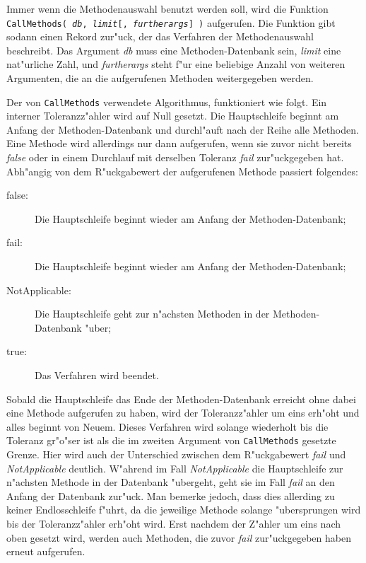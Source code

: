 \documentclass[a4paper,11pt]{article}
\theoremstyle{bla}
\begin{document}
Immer wenn die Methodenauswahl benutzt werden soll, wird die Funktion \texttt{CallMethods( \textit{db}, \textit{limit}[, \textit{furtherargs}] )} aufgerufen. Die Funktion gibt sodann einen Rekord zur"uck, der das Verfahren der Methodenauswahl beschreibt. Das Argument \textit{db} muss eine Methoden-Datenbank sein, \textit{limit} eine nat"urliche Zahl, und \textit{furtherargs} steht f"ur eine beliebige Anzahl von weiteren Argumenten, die an die aufgerufenen Methoden weitergegeben werden.

Der von \texttt{CallMethods} verwendete Algorithmus, funktioniert wie folgt. Ein interner Toleranzz"ahler wird auf Null gesetzt. Die Hauptschleife beginnt am Anfang der Methoden-Datenbank und durchl"auft nach der Reihe alle Methoden. Eine Methode wird allerdings nur dann aufgerufen, wenn sie zuvor nicht bereits \textit{false} oder in einem Durchlauf mit derselben Toleranz \textit{fail} zur"uckgegeben hat. Abh"angig von dem R"uckgabewert der aufgerufenen Methode passiert folgendes:

\begin{description}
 \item[false:] Die Hauptschleife beginnt wieder am Anfang der Methoden-Datenbank;
 \item[fail:] Die Hauptschleife beginnt wieder am Anfang der Methoden-Datenbank;
 \item[NotApplicable:] Die Hauptschleife geht zur n"achsten Methoden in der Methoden-Datenbank "uber;
 \item[true:] Das Verfahren wird beendet.
\end{description}

Sobald die Hauptschleife das Ende der Methoden-Datenbank erreicht ohne dabei eine Methode aufgerufen zu haben, wird der Toleranzz"ahler um eins erh"oht und alles beginnt von Neuem. Dieses Verfahren wird solange wiederholt bis die Toleranz gr"o"ser ist als die im zweiten Argument von \texttt{CallMethods} gesetzte Grenze.
Hier wird auch der Unterschied zwischen dem R"uckgabewert \textit{fail} und \textit{NotApplicable} deutlich. W"ahrend im Fall \textit{NotApplicable} die Hauptschleife zur n"achsten Methode in der Datenbank "ubergeht, geht sie im Fall \textit{fail} an den Anfang der Datenbank zur"uck.
Man bemerke jedoch, dass dies allerding zu keiner Endlosschleife f"uhrt, da die jeweilige Methode solange "ubersprungen wird bis der Toleranzz"ahler erh"oht wird. Erst nachdem der Z"ahler um eins nach oben gesetzt wird, werden auch Methoden, die zuvor \textit{fail} zur"uckgegeben haben erneut aufgerufen. 
\end{document}
